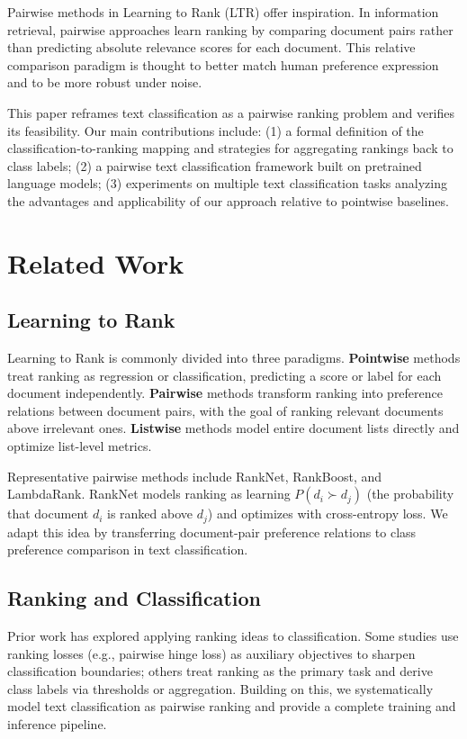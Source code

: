 \documentclass[11pt, a4paper]{article}
\begin{document}
Pairwise methods in Learning to Rank (LTR) offer inspiration. In information retrieval, pairwise approaches learn ranking by comparing document pairs rather than predicting absolute relevance scores for each document. This relative comparison paradigm is thought to better match human preference expression and to be more robust under noise.

This paper reframes text classification as a pairwise ranking problem and verifies its feasibility. Our main contributions include: (1) a formal definition of the classification-to-ranking mapping and strategies for aggregating rankings back to class labels; (2) a pairwise text classification framework built on pretrained language models; (3) experiments on multiple text classification tasks analyzing the advantages and applicability of our approach relative to pointwise baselines.

\section{Related Work}

\subsection{Learning to Rank}

Learning to Rank is commonly divided into three paradigms. \textbf{Pointwise} methods treat ranking as regression or classification, predicting a score or label for each document independently. \textbf{Pairwise} methods transform ranking into preference relations between document pairs, with the goal of ranking relevant documents above irrelevant ones. \textbf{Listwise} methods model entire document lists directly and optimize list-level metrics.

Representative pairwise methods include RankNet, RankBoost, and LambdaRank. RankNet models ranking as learning $P(d_i \succ d_j)$ (the probability that document $d_i$ is ranked above $d_j$) and optimizes with cross-entropy loss. We adapt this idea by transferring document-pair preference relations to class preference comparison in text classification.

\subsection{Ranking and Classification}

Prior work has explored applying ranking ideas to classification. Some studies use ranking losses (e.g., pairwise hinge loss) as auxiliary objectives to sharpen classification boundaries; others treat ranking as the primary task and derive class labels via thresholds or aggregation. Building on this, we systematically model text classification as pairwise ranking and provide a complete training and inference pipeline.
\end{document}
